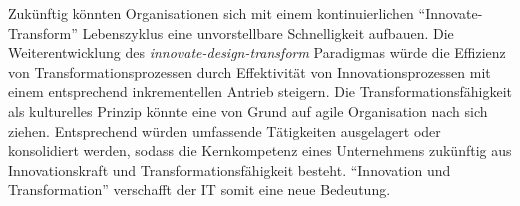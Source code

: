 Zukünftig könnten Organisationen sich mit einem kontinuierlichen \enquote{Innovate-Transform} Lebenszyklus eine unvorstellbare Schnelligkeit aufbauen.
Die Weiterentwicklung des \emph{innovate-design-transform} Paradigmas würde die Effizienz von Transformationsprozessen durch Effektivität von Innovationsprozessen mit einem entsprechend inkrementellen Antrieb steigern. Die Transformationsfähigkeit als kulturelles Prinzip könnte eine von Grund auf agile Organisation nach sich ziehen. Entsprechend würden umfassende Tätigkeiten ausgelagert oder konsolidiert werden, sodass die Kernkompetenz eines Unternehmens zukünftig aus Innovationskraft und Transformationsfähigkeit besteht. \enquote{Innovation und Transformation} verschafft der IT somit eine neue Bedeutung.